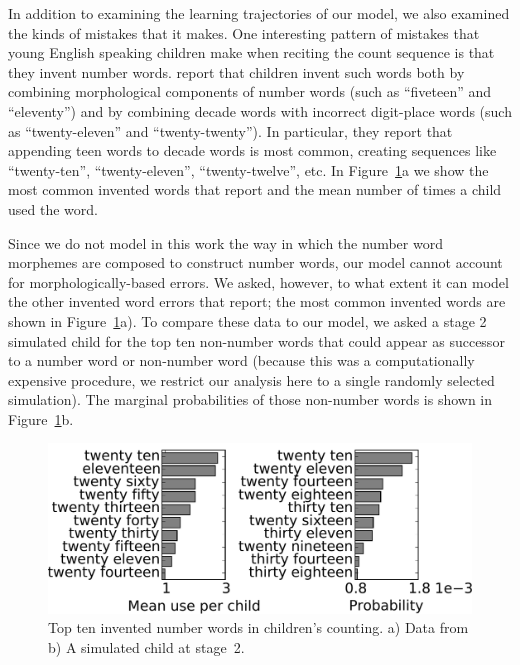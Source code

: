 \documentclass[10pt,letterpaper]{article}
\begin{document}
In addition to examining the learning trajectories of our model, we
also examined the kinds of mistakes that it makes. One interesting
pattern of mistakes that young English speaking children make when
reciting the count sequence is that they invent number
words. \citeauthor{FusRicBriar1982} report that children invent such
words both by combining morphological components of number words (such
as ``fiveteen'' and ``eleventy'') and by combining decade words with
incorrect digit-place words (such as ``twenty-eleven'' and
``twenty-twenty''). In particular, they report that appending
teen words to decade words is most common, creating sequences
like ``twenty-ten'', ``twenty-eleven'', ``twenty-twelve'', etc.
In Figure~\ref{fig:inventedWordComparison}a we show the most common invented
words that \citeauthor{FusRicBriar1982} report and the mean number of
times a child used the word. 

Since we do not model in this work the way in which the number word
morphemes are composed to construct number words, our model cannot
account for morphologically-based errors. We asked, however, to what
extent it can model the other invented word errors that
\citeauthor{FusRicBriar1982} report; the most common invented words
are shown in Figure~\ref{fig:inventedWordComparison}a). To compare
these data to our model, we asked a stage 2 simulated child for the
top ten non-number words that could appear as successor to a number
word or non-number word (because this was a computationally expensive
procedure, we restrict our analysis here to a single randomly selected
simulation). The marginal probabilities of those non-number words is
shown in Figure~\ref{fig:inventedWordComparison}b.

\begin{figure}[t]
\includegraphics[width=0.9\linewidth]{figures/inventedWordComparison3}
\caption{Top ten invented number words in children's counting. a) Data
  from \citeauthor{FusRicBriar1982} b) A simulated child at stage~2.
   \label{fig:inventedWordComparison}}
\end{figure}
\end{document}
